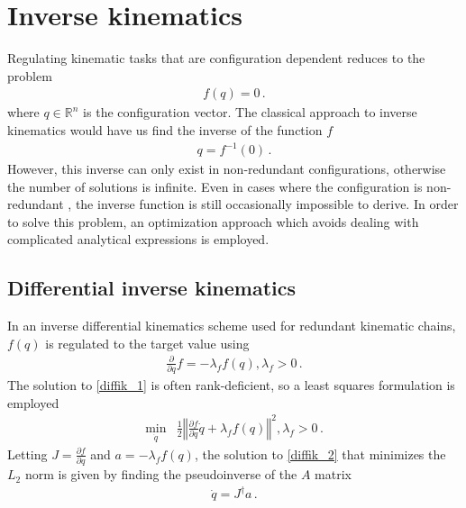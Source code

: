 \documentclass[times, utf8, diplomski, english]{fer}
\begin{document}
\section{Inverse kinematics}\label{section:inverse kinematics}
Regulating kinematic tasks that are configuration dependent reduces to the problem
\begin{align}
f\left(q\right) = 0 \, . %
\end{align}
where $q \in \mathbb{R}^{n} $  is the configuration vector. 
The classical approach to inverse kinematics would have us find the inverse of the function $f$
\begin{align}
q = f^{-1}\left(0\right)\, . \label{eq:inverse}
\end{align}
However, this inverse can only exist in non-redundant configurations, otherwise the number of solutions is infinite.
Even in cases where the configuration is non-redundant , the inverse function is still occasionally impossible to derive.
In order to solve this problem, an optimization approach which avoids dealing with complicated analytical expressions is employed.
\subsection{Differential inverse kinematics}
In an inverse differential kinematics scheme used for redundant kinematic chains, $f\left(q\right)$ is regulated to the target value using
\begin{align}
\label{diffik_1}
\frac{\partial}{\partial q}f = -\lambda_{f}f\left(q\right), \lambda_{f} > 0 \, .
\end{align}
The solution to \ref{diffik_1} is often rank-deficient, so a least squares formulation is employed
\begin{align}
\label{diffik_2}
\min\limits_{\dot{q}} & \frac{1}{2}\left\Vert\frac{\partial f}{\partial q} \dot{q} + \lambda_{f}f\left(q\right)\right\Vert^2, \lambda_{f} > 0 \, .
\end{align}
Letting $J = \frac{\partial f}{\partial q}$ and $a = -\lambda_{f}f\left(q\right)$, the solution to \ref{diffik_2} that minimizes the $L_{2}$ norm is given by finding the pseudoinverse of the $A$ matrix
\begin{align}
\label{diffik_4}
\dot{q} = J^{\dagger}a  \, .
\end{align}
\end{document}
